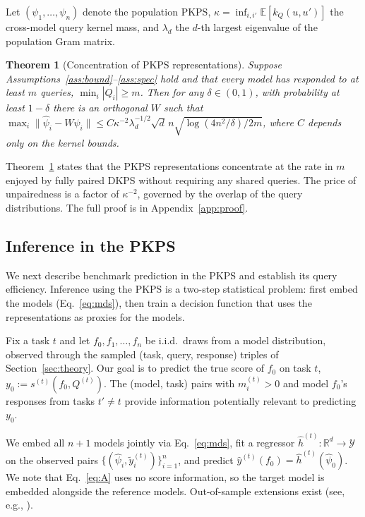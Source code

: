 \documentclass{article}
\newtheorem{theorem}{Theorem}
\theoremstyle{definition}
\theoremstyle{plain}
\newcommand{\PKPS}{PKPS\xspace}
\begin{document}
Let $(\psi_1,\dots,\psi_n)$ denote the population \PKPS, $\kappa=\inf_{i,i'}\mathbb{E}[k_Q(u,u')]$ the cross-model
query kernel mass, and $\lambda_d$ the $d$-th largest eigenvalue of the population Gram matrix.
\begin{theorem}[Concentration of \PKPS representations]
\label{prop:conc}
Suppose Assumptions~\ref{ass:bound}--\ref{ass:spec} hold and that every model has
responded to at least $m$ queries, $\min_i|Q_i|\ge m$. Then for any
$\delta\in(0,1)$, with probability at least $1-\delta$ there is an orthogonal $W$ such
that
$\max_i\|\hat\psi_i-W\psi_i\|\le
C\kappa^{-2}\lambda_d^{-1/2}\sqrt{d}\,n\sqrt{\log(4n^2/\delta)/2m}$,
where $C$ depends only on the kernel bounds.
\end{theorem}

Theorem~\ref{prop:conc} states that the \PKPS representations concentrate at the rate in $ m $ enjoyed by fully paired DKPS \citep{acharyya2025concentration} without requiring any shared queries.
The price of unpairedness is a factor of $\kappa^{-2}$, governed by
the overlap of the query distributions.
The full proof is in Appendix~\ref{app:proof}.

\subsection{Inference in the \PKPS}
\label{sec:qeff}
We next describe benchmark prediction in the \PKPS and establish its query
efficiency.
Inference using the \PKPS is a two-step statistical problem: first embed the
models (Eq.~\eqref{eq:mds}), then train a decision function that uses the
representations as proxies for the models.

Fix a task $t$ and let $f_{0},f_{1},\hdots,f_{n}$ be i.i.d.\ draws from a model
distribution, observed through the sampled (task, query, response) triples of
Section~\ref{sec:theory}.
Our goal is to predict the true score of $f_{0}$ on task $t$,
$y_{0}:=s^{(t)}(f_{0},Q^{(t)})$.
The (model, task) pairs with $m_{i}^{(t)}>0$ and model $ f_{0}$'s responses from tasks $ t' \neq t $ provide information potentially
relevant to predicting $y_{0}$.

We embed all $n{+}1$ models jointly via Eq.~\eqref{eq:mds}, fit a regressor $\hat h^{(t)}:\mathbb{R}^{d}\to\mathcal{Y}$ on
the observed pairs $\{(\hat\psi_{i},\tilde{y}_{i}^{(t)})\}_{i=1}^{n}$, and
predict $\hat y^{(t)}(f_{0})=\hat h^{(t)}(\hat\psi_{0})$.
We note that Eq.~\eqref{eq:A} uses no
score information, so the target model is embedded alongside the reference models.
Out-of-sample extensions exist (see, e.g., \citealp{trosset2008out, 10.3389/fnhum.2022.930291}).
\end{document}
